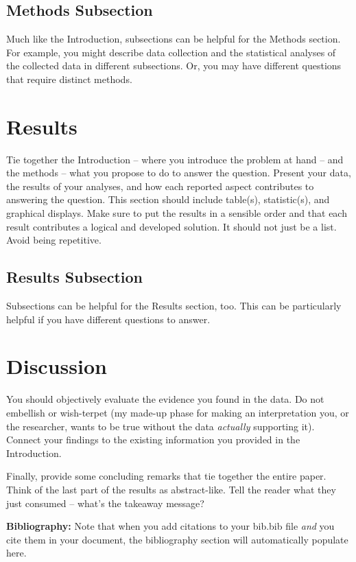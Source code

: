 \documentclass{article}\usepackage[]{graphicx}\usepackage[]{xcolor}
\begin{document}
\begin{multicols}{2}
\subsection{Methods Subsection}
Much like the Introduction, subsections can be helpful for the Methods section. For example, you might describe data collection and the statistical analyses of the collected data in different subsections. Or, you may have different questions that require distinct methods. 

\section{Results}
Tie together the Introduction -- where you introduce the problem at hand -- and the methods --  what you propose to do to answer the question. Present your data, the results of your analyses, and how each reported aspect contributes to answering the question. This section should include table(s), statistic(s), and graphical displays. Make sure to put the results in a sensible order and that each result contributes a logical and developed solution. It should not just be a list. Avoid being repetitive. 

\subsection{Results Subsection}
Subsections can be helpful for the Results section, too. This can be particularly helpful if you have different questions to answer. 


\section{Discussion}
 You should objectively evaluate the evidence you found in the data. Do not embellish or wish-terpet (my made-up phase for making an interpretation you, or the researcher, wants to be true without the data \emph{actually} supporting it). Connect your findings to the existing information you provided in the Introduction.

Finally, provide some concluding remarks that tie together the entire paper. Think of the last part of the results as abstract-like. Tell the reader what they just consumed -- what's the takeaway message?

\vspace{2em}

\noindent\textbf{Bibliography:} Note that when you add citations to your bib.bib file \emph{and}
you cite them in your document, the bibliography section will automatically populate here.

\begin{tiny}

\end{tiny}
\end{multicols}
\end{document}
